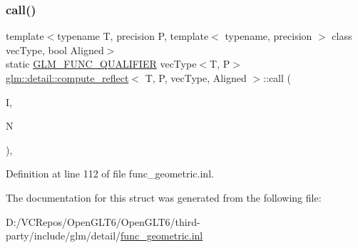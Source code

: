 \subsubsection{\texorpdfstring{call()}{call()}}
{\footnotesize\ttfamily template$<$typename T, precision P, template$<$ typename, precision $>$ class vec\+Type, bool Aligned$>$ \\
static \mbox{\hyperlink{setup_8hpp_a33fdea6f91c5f834105f7415e2a64407}{G\+L\+M\+\_\+\+F\+U\+N\+C\+\_\+\+Q\+U\+A\+L\+I\+F\+I\+ER}} vec\+Type$<$T, P$>$ \mbox{\hyperlink{structglm_1_1detail_1_1compute__reflect}{glm\+::detail\+::compute\+\_\+reflect}}$<$ T, P, vec\+Type, Aligned $>$\+::call (\begin{DoxyParamCaption}\item[{vec\+Type$<$ T, P $>$ const \&}]{I,  }\item[{vec\+Type$<$ T, P $>$ const \&}]{N }\end{DoxyParamCaption})\hspace{0.3cm}{\ttfamily [inline]}, {\ttfamily [static]}}



Definition at line 112 of file func\+\_\+geometric.\+inl.



The documentation for this struct was generated from the following file\+:\begin{DoxyCompactItemize}
\item 
D\+:/\+V\+C\+Repos/\+Open\+G\+L\+T6/\+Open\+G\+L\+T6/third-\/party/include/glm/detail/\mbox{\hyperlink{func__geometric_8inl}{func\+\_\+geometric.\+inl}}\end{DoxyCompactItemize}
